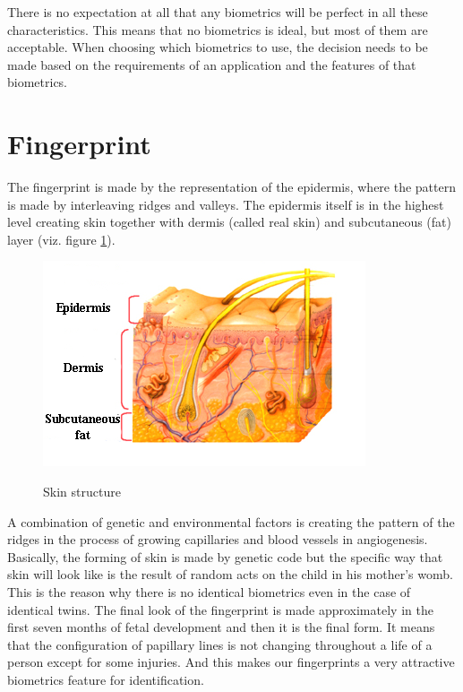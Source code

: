There is no expectation at all that any biometrics will be perfect in all these characteristics. This means that no biometrics is ideal, but most of them are acceptable. When choosing which biometrics to use, the decision needs to be made based on the requirements of an application and the features of that biometrics.

\section{Fingerprint}
The fingerprint is made by the representation of the epidermis, where the pattern is made by interleaving ridges and valleys. The epidermis itself is in the highest level creating skin together with dermis (called real skin) and subcutaneous (fat) layer  \cite{jain2007handbook}(viz. figure \ref{fig:skin}).

\begin{figure}[H]
    \centering
        {\includegraphics[width=0.6\linewidth]{obrazky-figures/skin.png}}\\
        \caption{Skin structure \cite{Skinanat76:online}}
        \label{fig:skin}
\end{figure}

A combination of genetic and environmental factors is creating the pattern of the ridges in the process of growing capillaries and blood vessels in angiogenesis. Basically, the forming of skin is made by genetic code but the specific way that skin will look like is the result of random acts on the child in his mother’s womb. This is the reason why there is no identical biometrics even in the case of identical twins. The final look of the fingerprint is made approximately in the first seven months of fetal development and then it is the final form. It means that the configuration of papillary lines is not changing throughout a life of a person except for some injuries. And this makes our fingerprints a very attractive biometrics feature for identification. \cite{maltoni2009handbook} \cite{babler1991embryologic}

